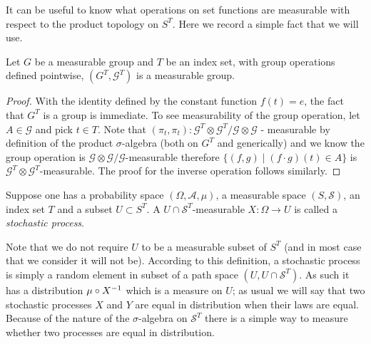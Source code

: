 It can be useful to know what operations on set functions are
measurable with respect to the product topology on $S^T$.  Here we
record a simple fact that we will use.
\begin{lem}\label{MeasurableFunctionGroup}Let $G$ be a measurable
  group and $T$ be an index set, with group operations defined pointwise, $(G^T, \mathcal{G}^T)$ is a  measurable group.
\end{lem}
\begin{proof}
With the identity defined by the constant function $f(t) = e$, the
fact that $G^T$ is a group is immediate.  To see measurability of the
group operation, let $A \in \mathcal{G}$ and pick $t \in T$.  Note
that $(\pi_t, \pi_t) : \mathcal{G}^T \otimes \mathcal{G}^T / \mathcal{G} \otimes \mathcal{G}$ - measurable by
definition of the product $\sigma$-algebra (both on $G^T$ and
generically) and we know the group operation is $\mathcal{G} \otimes
\mathcal{G}/\mathcal{G}$-measurable therefore $\lbrace (f,g) \mid (f
\cdot g)(t) \in A \rbrace$ is $\mathcal{G}^T \otimes
\mathcal{G}^T$-measurable.  The proof for the inverse operation
follows similarly.
\end{proof}

\begin{defn}Suppose one has a probability space $(\Omega,
  \mathcal{A}, \mu)$, a measurable space $(S, \mathcal{S})$, an
  index set $T$ and a subset $U \subset S^T$.  A $U \cap
  \mathcal{S}^T$-measurable $X : \Omega \to U$ is called a
  \emph{stochastic process}.
\end{defn}

Note that we do not require $U$ to be a measurable subset of $S^T$
(and in most case that we consider it will not be).
According to this definition, a stochastic process is simply a random
element in subset of a path space $(U, U \cap \mathcal{S}^T)$.  As such it has a
distribution $\mu \circ X^{-1}$ which is a measure on $U$; as usual we will say
that two stochastic processes $X$ and $Y$ are equal in distribution
when their laws are equal.  Because of the nature of the
$\sigma$-algebra on $\mathcal{S}^T$ there is a simple way to measure
whether two processes are equal in distribution.

